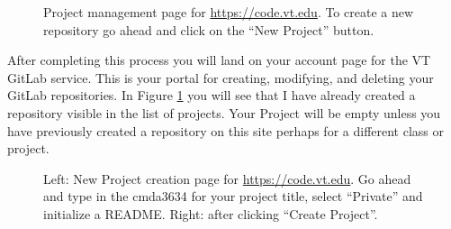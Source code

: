 \begin{figure}[htbp!]
    \centering
    \caption{Project management page for \href{https://code.vt.edu}{https://code.vt.edu}. To create a new repository go ahead and click on the ``New Project'' button.}
    \label{projectsCodeVtEdu.fig}
\end{figure}

After completing this process you will land on your account page for the VT GitLab service. This is your portal for creating, modifying, and deleting your GitLab repositories. In Figure \ref{projectsCodeVtEdu.fig} you will see that I have already created a repository visible in the list of projects. Your Project will be empty unless you have previously created a repository on this site perhaps for a different class or project. 

\begin{figure}[htbp!]
    \centering
    \caption{Left: New Project creation page for \href{https://code.vt.edu}{https://code.vt.edu}. Go ahead and type in the cmda3634 for your project title, select ``Private'' and initialize a README. Right: after clicking ``Create Project''.}
    \label{newProjectCodeVtEdu.fig}
\end{figure}

